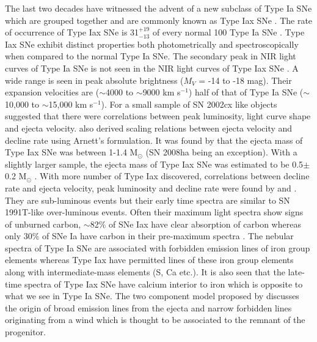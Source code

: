 \documentclass[fleqn,usenatbib]{mnras}
\begin{document}
The last two decades have witnessed the advent of a new subclass of Type Ia SNe which are grouped together and are commonly known as Type Iax SNe \citep{2013ApJ...767...57F}. The rate of occurrence of Type Iax SNe is 31$^{+19}_{-13}$ of every normal 100 Type Ia SNe \citep{2013ApJ...767...57F}. Type Iax SNe exhibit distinct properties both photometrically and spectroscopically when compared to the normal Type Ia SNe. The secondary peak in NIR light curves of Type Ia SNe is not seen in the NIR light curves of Type Iax SNe \citep{2003PASP..115..453L}. A wide range is seen in peak absolute brightness ($M$${_V}$ = -14 to -18 mag). Their expansion velocities are ($\sim$4000 to $\sim$9000 km s$^{-1}$) half of that of Type Ia SNe ($\sim$10,000 to $\sim$15,000 km s$^{-1}$). For a small sample of SN 2002cx like objects \cite{2010ApJ...720..704M} suggested that there were correlations between peak luminosity, light curve shape and ejecta velocity. \cite{2011ApJ...731L..11N} also derived scaling relations between ejecta velocity and decline rate using Arnett's formulation. It was found by \cite{2011ApJ...731L..11N} that the ejecta mass of Type Iax SNe was between 1-1.4 M{$_\odot$} (SN 2008ha being an exception). With a slightly larger sample, the ejecta mass of Type Iax SNe was estimated to be 0.5$\pm$0.2 M{$_\odot$} \citep{2013ApJ...767...57F}. With more number of Type Iax discovered, correlations between decline rate and ejecta velocity, peak luminosity and decline rate were found by \cite{2013ApJ...767...57F} and \cite{2016A&A...589A..89M}. They are sub-luminous events but their early time spectra are similar to SN 1991T-like over-luminous events. Often their maximum light spectra show signs of unburned carbon, $\sim$82$\%$ of SNe Iax have clear absorption of carbon whereas only 30$\%$ of SNe Ia have carbon in their pre-maximum spectra \citep{2013ApJ...767...57F}. The nebular spectra of Type Ia SNe are associated with forbidden emission lines of iron group elements whereas Type Iax have permitted lines of these iron group elements along with intermediate-mass elements (S, Ca etc.). It is also seen that the late-time spectra of Type Iax SNe have calcium interior to iron \citep{2013ApJ...767...57F} which is opposite to what we see in Type Ia SNe. The two component model proposed by \cite{2016MNRAS.461..433F} discusses the origin of broad emission lines from the ejecta and narrow forbidden lines originating from a wind which is thought to be associated to the remnant of the progenitor.
\end{document}
